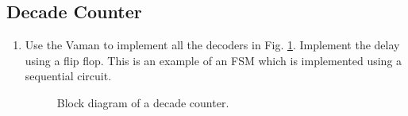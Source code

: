 \documentclass[journal,12pt,twocolumn]{IEEEtran}
\renewcommand\thesection{\arabic{section}}
\renewcommand\thesubsection{\thesection.\arabic{subsection}}
\begin{document}
\subsection{Decade Counter }
\renewcommand{\theequation}{\theenumi}
\renewcommand{\thefigure}{\theenumi}
\begin{enumerate}[label=\thesubsection.\arabic*.,ref=\thesubsection.\theenumi]

\item Use the Vaman to implement all the decoders in Fig.  \ref{fig:vaman/arm/fsm/vaman_decade_counter}.  Implement the delay using a flip flop.  This is an 
example of an FSM which is implemented using a sequential circuit.

\begin{figure}[!ht]
\centering
\resizebox{\columnwidth}{!}{

}
\caption{Block diagram of a decade counter.}
\label{fig:vaman/arm/fsm/vaman_decade_counter}
\end{figure}


\end{enumerate}
%
\end{document}
